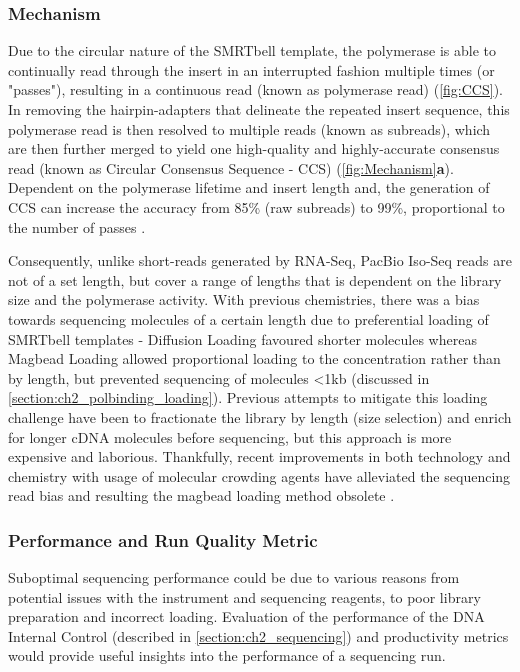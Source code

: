 \subsubsection{Mechanism}
Due to the circular nature of the SMRTbell template, the polymerase is able to continually read through the insert in an interrupted fashion multiple times (or "passes"), resulting in a continuous read (known as polymerase read) (\cref{fig:CCS}). In removing the hairpin-adapters that delineate the repeated insert sequence, this polymerase read is then resolved to multiple reads (known as subreads), which are then further merged to yield one high-quality and highly-accurate consensus read (known as Circular Consensus Sequence - CCS) (\cref{fig:Mechanism}\textbf{a}). Dependent on the polymerase lifetime and insert length and, the generation of CCS can increase the accuracy from 85\% (raw subreads) to 99\%, proportional to the number of passes \cite{Travers2010}. 

Consequently, unlike short-reads generated by RNA-Seq, PacBio Iso-Seq reads are not of a set length, but cover a range of lengths that is dependent on the library size and the polymerase activity\cite{Ardui2018,Rhoads2015}. With previous chemistries, there was a bias towards sequencing molecules of a certain length due to preferential loading of SMRTbell templates - Diffusion Loading favoured shorter molecules\cite{Loomis2013} whereas Magbead Loading allowed proportional loading to the concentration rather than by length, but prevented sequencing of molecules <1kb (discussed in \cref{section:ch2_polbinding_loading}). Previous attempts to mitigate this loading challenge have been to fractionate the library by length (size selection) and enrich for longer cDNA molecules before sequencing\cite{Au2013}, but this approach is more expensive and laborious. Thankfully, recent improvements in both technology and chemistry with usage of molecular crowding agents have alleviated the sequencing read bias and resulting the magbead loading method obsolete \cite{Oikonomopoulos2020}.   


\subsubsection{Performance and Run Quality Metric}
Suboptimal sequencing performance could be due to various reasons from potential issues with the instrument and sequencing reagents, to poor library preparation and incorrect loading. Evaluation of the performance of the DNA Internal Control (described in \cref{section:ch2_sequencing}) and productivity metrics would provide useful insights into the performance of a sequencing run. 


